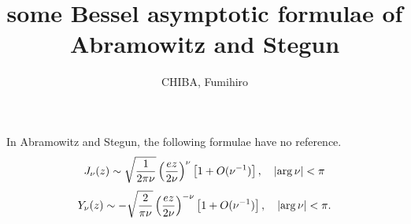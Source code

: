 \documentclass[12pt]{report}
\begin{document}

%

\title{some Bessel asymptotic formulae of Abramowitz and Stegun}
\author{CHIBA, Fumihiro}
\maketitle

In Abramowitz and Stegun\cite{Abramowitz-Stegun}, the following formulae have no reference.
$$
J_\nu(z) \sim \sqrt{\frac{1}{2\pi\nu}}\left(\frac{ez}{2\nu}\right)^\nu\left[1+O(\nu^{-1})\right], \quad |{\rm arg}\, \nu|<\pi
$$
$$
Y_{\nu}(z) \sim -\sqrt{\frac{2}{\pi\nu}}\left(\frac{ez}{2\nu}\right)^{-\nu}\left[1+O(\nu^{-1})\right], \quad |{\rm arg}\, \nu|<\pi.
$$
\end{document}

